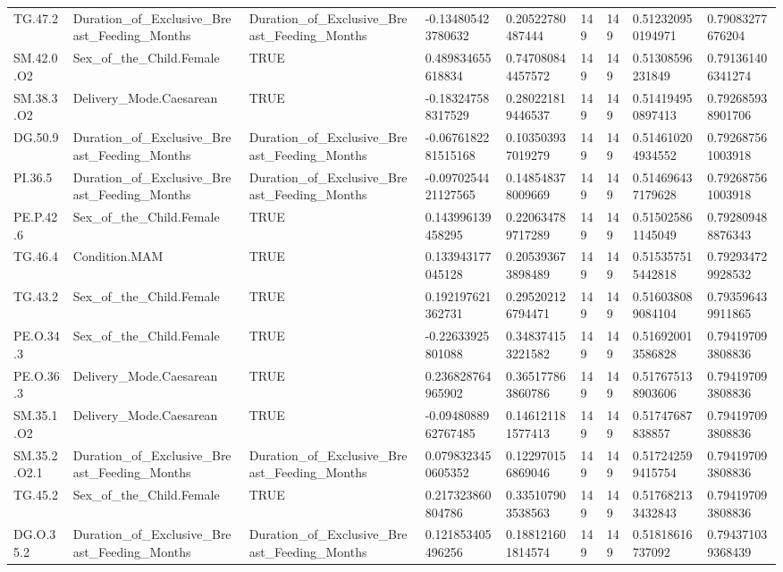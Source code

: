 \begin{longtable}{lllllllll}
TG.47.2 & Duration\_of\_Exclusive\_Breast\_Feeding\_Months & Duration\_of\_Exclusive\_Breast\_Feeding\_Months & -0.134805423780632 & 0.20522780487444 & 149 & 149 & 0.512320950194971 & 0.79083277676204 \\
SM.42.0.O2 & Sex\_of\_the\_Child.Female & TRUE & 0.489834655618834 & 0.747080844457572 & 149 & 149 & 0.51308596231849 & 0.791361406341274 \\
SM.38.3.O2 & Delivery\_Mode.Caesarean & TRUE & -0.183247588317529 & 0.280221819446537 & 149 & 149 & 0.514194950897413 & 0.792685938901706 \\
DG.50.9 & Duration\_of\_Exclusive\_Breast\_Feeding\_Months & Duration\_of\_Exclusive\_Breast\_Feeding\_Months & -0.0676182281515168 & 0.103503937019279 & 149 & 149 & 0.514610204934552 & 0.792687561003918 \\
PI.36.5 & Duration\_of\_Exclusive\_Breast\_Feeding\_Months & Duration\_of\_Exclusive\_Breast\_Feeding\_Months & -0.0970254421127565 & 0.148548378009669 & 149 & 149 & 0.514696437179628 & 0.792687561003918 \\
PE.P.42.6 & Sex\_of\_the\_Child.Female & TRUE & 0.143996139458295 & 0.220634789717289 & 149 & 149 & 0.515025861145049 & 0.792809488876343 \\
TG.46.4 & Condition.MAM & TRUE & 0.133943177045128 & 0.205393673898489 & 149 & 149 & 0.515357515442818 & 0.792934729928532 \\
TG.43.2 & Sex\_of\_the\_Child.Female & TRUE & 0.192197621362731 & 0.295202126794471 & 149 & 149 & 0.516038089084104 & 0.793596439911865 \\
PE.O.34.3 & Sex\_of\_the\_Child.Female & TRUE & -0.22633925801088 & 0.348374153221582 & 149 & 149 & 0.516920013586828 & 0.794197093808836 \\
PE.O.36.3 & Delivery\_Mode.Caesarean & TRUE & 0.236828764965902 & 0.365177863860786 & 149 & 149 & 0.517675138903606 & 0.794197093808836 \\
SM.35.1.O2 & Delivery\_Mode.Caesarean & TRUE & -0.0948088962767485 & 0.146121181577413 & 149 & 149 & 0.51747687838857 & 0.794197093808836 \\
SM.35.2.O2.1 & Duration\_of\_Exclusive\_Breast\_Feeding\_Months & Duration\_of\_Exclusive\_Breast\_Feeding\_Months & 0.0798323450605352 & 0.122970156869046 & 149 & 149 & 0.517242599415754 & 0.794197093808836 \\
TG.45.2 & Sex\_of\_the\_Child.Female & TRUE & 0.217323860804786 & 0.335107903538563 & 149 & 149 & 0.517682133432843 & 0.794197093808836 \\
DG.O.35.2 & Duration\_of\_Exclusive\_Breast\_Feeding\_Months & Duration\_of\_Exclusive\_Breast\_Feeding\_Months & 0.121853405496256 & 0.188121601814574 & 149 & 149 & 0.51818616737092 & 0.794371039368439 \\

\end{longtable}
